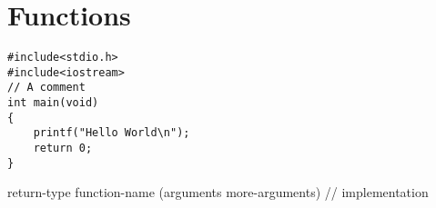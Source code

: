 \chapter{Functions}
\lstset{language=C}
\begin{lstlisting}
#include<stdio.h>
#include<iostream>
// A comment
int main(void)
{
    printf("Hello World\n");
    return 0;
}
\end{lstlisting}

return-type
function-name (arguments
               more-arguments)
{
    // implementation
}
